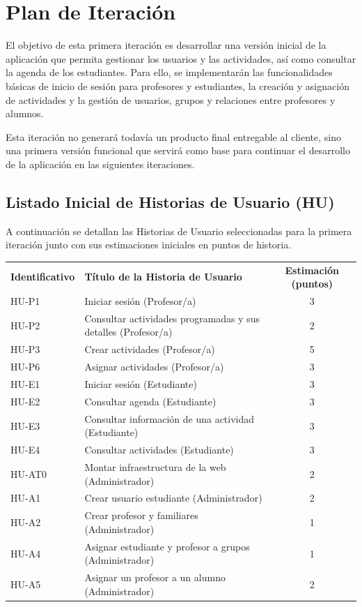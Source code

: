 
\section{Plan de Iteración}
El objetivo de esta primera iteración es desarrollar una versión inicial de la aplicación que permita gestionar los usuarios y las actividades, así como consultar la agenda de los estudiantes. Para ello, se implementarán las funcionalidades básicas de inicio de sesión para profesores y estudiantes, la creación y asignación de actividades y la gestión de usuarios, grupos y relaciones entre profesores y alumnos.

Esta iteración no generará todavía un producto final entregable al cliente, sino una primera versión funcional que servirá como base para continuar el desarrollo de la aplicación en las siguientes iteraciones.

\subsection{Listado Inicial de Historias de Usuario (HU)}
A continuación se detallan las Historias de Usuario seleccionadas para la primera iteración junto con sus estimaciones iniciales en puntos de historia.

\vspace{0.3cm}
\begin{center}
\begin{tabularx}{\textwidth}{l X c}
\rowcolor{azulPastelApagado}
\textbf{\color{white}Identificativo} & \textbf{\color{white}Título de la Historia de Usuario} & \textbf{\color{white}Estimación (puntos)} \\
\textsf{HU-P1} & Iniciar sesión (Profesor/a) & 3 \\
\textsf{HU-P2} & Consultar actividades programadas y sus detalles (Profesor/a) & 2 \\
\textsf{HU-P3} & Crear actividades (Profesor/a) & 5 \\
\textsf{HU-P6} & Asignar actividades (Profesor/a) & 3 \\
\textsf{HU-E1} & Iniciar sesión (Estudiante) & 3 \\
\textsf{HU-E2} & Consultar agenda (Estudiante) & 3 \\
\textsf{HU-E3} & Consultar información de una actividad (Estudiante) & 3 \\
\textsf{HU-E4} & Consultar actividades (Estudiante) & 3 \\
\textsf{HU-AT0} & Montar infraestructura de la web (Administrador) & 2 \\
\textsf{HU-A1} & Crear usuario estudiante (Administrador) & 2 \\
\textsf{HU-A2} & Crear profesor y familiares (Administrador) & 1 \\
\textsf{HU-A4} & Asignar estudiante y profesor a grupos (Administrador) & 1 \\
\textsf{HU-A5} & Asignar un profesor a un alumno (Administrador) & 2 \\
\end{tabularx}
\end{center}
\vspace{0.3cm}

